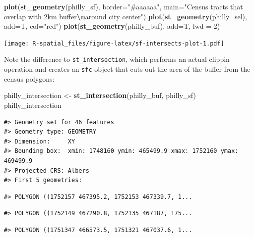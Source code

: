 \documentclass[
]{book}
\newenvironment{Shaded}{\begin{snugshade}}{\end{snugshade}}
\newcommand{\AttributeTok}[1]{\textcolor[rgb]{0.13,0.29,0.53}{#1}}
\newcommand{\DecValTok}[1]{\textcolor[rgb]{0.00,0.00,0.81}{#1}}
\newcommand{\FunctionTok}[1]{\textcolor[rgb]{0.13,0.29,0.53}{\textbf{#1}}}
\newcommand{\NormalTok}[1]{#1}
\newcommand{\OtherTok}[1]{\textcolor[rgb]{0.56,0.35,0.01}{#1}}
\newcommand{\SpecialCharTok}[1]{\textcolor[rgb]{0.81,0.36,0.00}{\textbf{#1}}}
\newcommand{\StringTok}[1]{\textcolor[rgb]{0.31,0.60,0.02}{#1}}
\begin{document}
\begin{Shaded}
\begin{Highlighting}[]
\FunctionTok{plot}\NormalTok{(}\FunctionTok{st\_geometry}\NormalTok{(philly\_sf), }\AttributeTok{border=}\StringTok{"\#aaaaaa"}\NormalTok{, }\AttributeTok{main=}\StringTok{"Census tracts that overlap with 2km buffer}\SpecialCharTok{\textbackslash{}n}\StringTok{around city center"}\NormalTok{)}
\FunctionTok{plot}\NormalTok{(}\FunctionTok{st\_geometry}\NormalTok{(philly\_sel), }\AttributeTok{add=}\NormalTok{T, }\AttributeTok{col=}\StringTok{"red"}\NormalTok{)}
\FunctionTok{plot}\NormalTok{(}\FunctionTok{st\_geometry}\NormalTok{(philly\_buf), }\AttributeTok{add=}\NormalTok{T, }\AttributeTok{lwd =} \DecValTok{2}\NormalTok{)}
\end{Highlighting}
\end{Shaded}

\texttt{[image: R-spatial\_files/figure-latex/sf-intersects-plot-1.pdf]}

Note the difference to \texttt{st\_intersection}, which performs an actual clippin operation and creates an \texttt{sfc} object that cuts out the area of the buffer from the census polygons:

\begin{Shaded}
\begin{Highlighting}[]
\NormalTok{philly\_intersection }\OtherTok{\textless{}{-}} \FunctionTok{st\_intersection}\NormalTok{(philly\_buf, philly\_sf)}
\NormalTok{philly\_intersection}
\end{Highlighting}
\end{Shaded}

\begin{verbatim}
#> Geometry set for 46 features 
#> Geometry type: GEOMETRY
#> Dimension:     XY
#> Bounding box:  xmin: 1748160 ymin: 465499.9 xmax: 1752160 ymax: 469499.9
#> Projected CRS: Albers
#> First 5 geometries:
\end{verbatim}

\begin{verbatim}
#> POLYGON ((1752157 467395.2, 1752153 467339.7, 1...
\end{verbatim}

\begin{verbatim}
#> POLYGON ((1752149 467290.8, 1752135 467187, 175...
\end{verbatim}

\begin{verbatim}
#> POLYGON ((1751347 466573.5, 1751321 467037.6, 1...
\end{verbatim}
\end{document}
